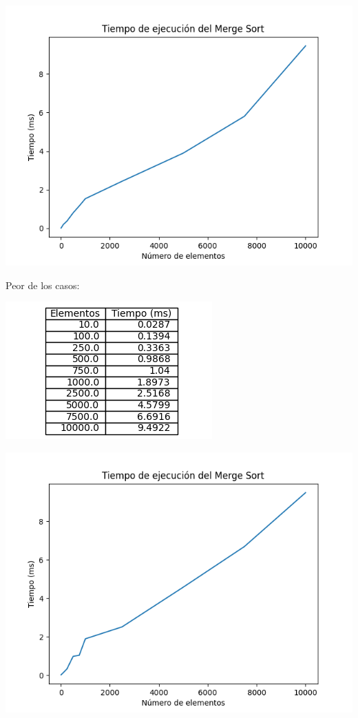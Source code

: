 \documentclass[14pt,a4paper]{report}
\begin{document}
\begin{center}
\includegraphics[scale=0.9]{../grafica-merge-best.png} 
\end{center}
Peor de los casos:
\begin{center}
\includegraphics[scale=1]{../tabla-merge-worst.png}  
\end{center}
\begin{center}
\includegraphics[scale=1]{../grafica-merge-worst.png} 
\end{center}
\end{document}
